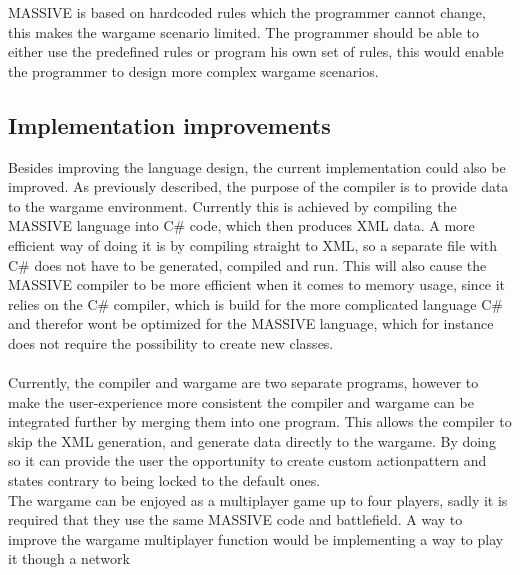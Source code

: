 MASSIVE is based on hardcoded rules which the programmer cannot change, this makes the wargame scenario limited. The programmer should be able to either use the predefined rules or program his own set of rules, this would enable the programmer to design more complex wargame scenarios.
\begin{comment}
@@@
To make the language more of a simulation and less of a game, it could also be implemented that the actionpatterns are not limited to the encounter and move functionality. These functionalities could be expanded by adding more states to the action interpreter. \\
A feature which enables the programmer to compare the current unit with units in its vicinity and act accordingly could also be implemented, this would give the agents a more independent and life-like behavior.
@@@
\end{comment}\subsection{Implementation improvements}
Besides improving the language design, the current implementation could also be improved. As previously described, the purpose of the compiler is to provide data to the wargame environment.
Currently this is achieved by compiling the MASSIVE language into C\# code, which then produces XML data. 
A more efficient way of doing it is by compiling straight to XML, so a separate file with C\# does not have to be generated, compiled and run. 
This will also cause the MASSIVE compiler to be more efficient when it comes to memory usage, since it relies on the C\# compiler, which is build for the more complicated language C\# and therefor wont be optimized for the MASSIVE language, which for instance does not require the possibility to create new classes.\\
 \\
Currently, the compiler and wargame are two separate programs, however to make the user-experience more consistent the compiler and wargame can be integrated further by merging them into one program.
This allows the compiler to skip the XML generation, and generate data directly to the wargame. By doing so it can provide the user the opportunity to create custom actionpattern and states contrary to being locked to the default ones.\newline
 \\
The wargame can be enjoyed as a multiplayer game up to four players, sadly it is required that they use the same MASSIVE code and battlefield. A way to improve the wargame multiplayer function would be implementing a way to play it though a network

